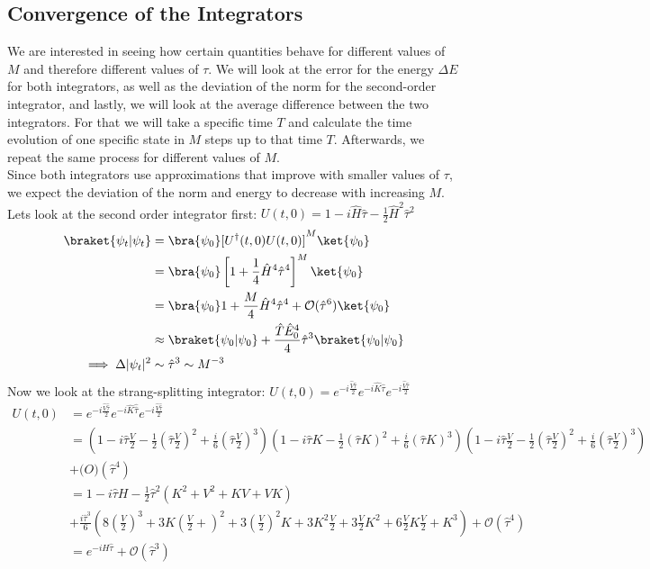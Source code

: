 \documentclass[11pt, letterpaper, onecolumn]{article}
\begin{document}
	\subsection{Convergence of the Integrators}
	We are interested in seeing how certain quantities behave for different values of $M$ and therefore different values of $\tau$. We will look at the error for the energy $\Delta E$ for both integrators, as well as the deviation of the norm for the second-order integrator, and lastly, we will look at the average difference between the two integrators. For that we will take a specific time $T$ and calculate the time evolution of one specific state in $M$ steps up to that time $T$. Afterwards, we repeat the same process for different values of $M$.\\
    Since both integrators use approximations that improve with smaller values of $\tau$, we expect the deviation of the norm and energy to decrease with increasing $M$. Lets look at the second order integrator first: $U(t,0)=1-i\hat{H}\hat{\tau}-\frac12\hat{H}^2\hat{\tau}^2$
    \begin{align*}
        \braket{\psi_t|\psi_t}&=\bra{\psi_0}[U^\dagger(t,0)U(t,0)]^M\ket{\psi_0}\\
        &=\bra{\psi_0}\left[1+\frac{1}{4}\hat{H}^4\hat{\tau}^4 \right]^M\ket{\psi_0}\\
        &=\bra{\psi_0}1+\frac{M}{4}\hat{H}^4\hat{\tau}^4+\mathcal{O}(\hat{\tau}^6)\ket{\psi_0}\\
        &\approx \braket{\psi_0|\psi_0}+\frac{\hat{T}\hat{E}_0^4}{4}\hat{\tau}^3\braket{\psi_0|\psi_0}\\
        \implies \Delta|\psi_t|^2&\sim\hat{\tau}^3\sim M^{-3}
    \end{align*}
    Now we look at the strang-splitting integrator: $U(t,0)=e^{-i\frac{\hat{V}\hat{\tau}}{2}}e^{-i\hat{K}\hat{\tau}}e^{-i\frac{\hat{V}\hat{\tau}}{2}}$
    \begin{align*}
        U(t,0)&=e^{-i\frac{\hat{V}\hat{\hat{\tau}}}{2}}e^{-i\hat{K}\hat{\hat{\tau}}}e^{-i\frac{\hat{V}\hat{\hat{\tau}}}{2}}\\
        &=(1-i\hat{\tau}\frac{V}{2}-\frac{1}{2}\left(\hat{\tau}\frac{V}{2}\right)^2+\frac{i}{6}\left(\hat{\tau}\frac{V}{2}\right)^3)(1-i\hat{\tau} K-\frac{1}{2}\left(\hat{\tau} K\right)^2+\frac{i}{6}\left(\hat{\tau} K\right)^3)(1-i\hat{\tau}\frac{V}{2}-\frac{1}{2}\left(\hat{\tau}\frac{V}{2}\right)^2+\frac{i}{6}\left(\hat{\tau}\frac{V}{2}\right)^3)\\&+\mathcal(O)(\hat{\tau}^4)\\
        &=1-i\hat{\tau} H-\frac{1}{2}\hat{\tau}^2(K^2+V^2+KV+VK)\\&+\frac{i\hat{\tau}^3}{6}\left(8\left(\frac{V}{2} \right)^3 + 3K\left(\frac{V}{2} +\right)^2 + 3\left(\frac{V}{2} \right)^2K +3K^2\frac{V}{2}+3\frac{V}{2}K^2 +6\frac{V}{2}K\frac{V}{2}+K^3 \right) +\mathcal{O}(\hat{\tau}^4)\\
        &=e^{-iH\hat{\tau}}+\mathcal{O}(\hat{\tau}^3)
    \end{align*}
\end{document}
